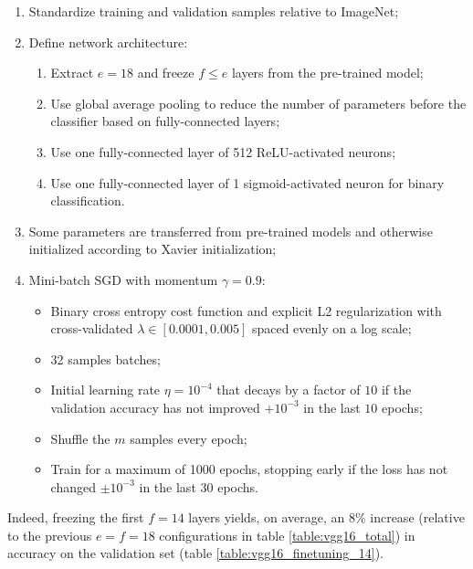 \begin{enumerate}
    \item Standardize training and validation samples relative to ImageNet;
    \item Define network architecture:
        \begin{enumerate}
            \item Extract $e = 18$ and freeze $f \leq e$ layers from the pre-trained model;
            \item Use global average pooling to reduce the number of parameters before the classifier based on fully-connected layers;
            \item Use one fully-connected layer of 512 ReLU-activated neurons;
            \item Use one fully-connected layer of 1 sigmoid-activated neuron for binary classification.
        \end{enumerate}
    \item Some parameters are transferred from pre-trained models and otherwise initialized according to Xavier \cite{xavierinit} initialization;
    \item Mini-batch \ac{SGD} with momentum $\gamma = 0.9$:
        \begin{itemize}
            \item Binary cross entropy cost function and explicit L2 regularization with cross-validated $\lambda \in [0.0001, 0.005]$ spaced evenly on a log scale;
            \item 32 samples batches;
            \item Initial learning rate $\eta = 10^{-4}$ that decays by a factor of $10$ if the validation accuracy has not improved $+10^{-3}$ in the last $10$ epochs;
            \item Shuffle the $m$ samples every epoch;
            \item Train for a maximum of 1000 epochs, stopping early if the loss has not changed $\pm 10^{-3}$ in the last $30$ epochs.
        \end{itemize}
\end{enumerate}

Indeed, freezing the first $f = 14$ layers yields, on average, an 8\% increase (relative to the previous $e = f = 18$ configurations in table \ref{table:vgg16_total}) in accuracy on the validation set (table \ref{table:vgg16_finetuning_14}).

